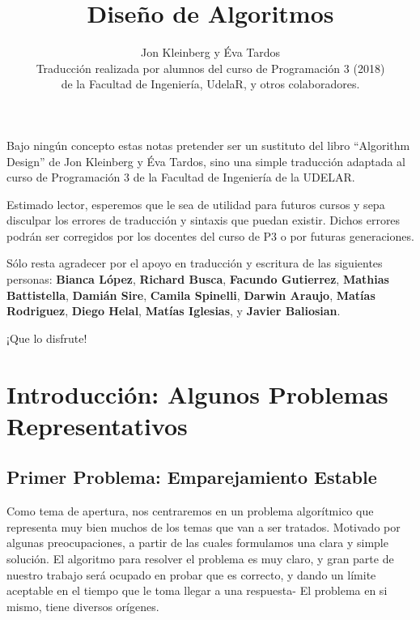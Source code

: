 \documentclass[a4paper, 12pt]{book}
\title{Diseño de Algoritmos}
\author{Jon Kleinberg y Éva Tardos\\ Traducción realizada por alumnos del curso de Programación 3 (2018)\\ de la Facultad de Ingeniería, UdelaR, y otros colaboradores.}
\theoremstyle{dotless}
\begin{document}
\maketitle	


\chapter*{}

Bajo ningún concepto estas notas pretender ser un sustituto del libro ``Algorithm Design'' de Jon Kleinberg y Éva Tardos, sino una simple traducción adaptada al curso de Programación 3 de la Facultad de Ingeniería de la UDELAR. 

Estimado lector, esperemos que le sea de utilidad para futuros cursos y sepa disculpar los errores de traducción y sintaxis que puedan existir. Dichos errores podrán ser corregidos por los docentes del curso de P3 o por futuras generaciones.

Sólo resta agradecer por el apoyo en traducción y escritura de las siguientes personas: \textbf{Bianca López}, \textbf{Richard Busca}, \textbf{Facundo Gutierrez}, \textbf{Mathias Battistella}, \textbf{Damián Sire}, \textbf{Camila Spinelli}, \textbf{Darwin Araujo},  \textbf{Matías Rodriguez}, \textbf{Diego Helal}, \textbf{Matías Iglesias}, y \textbf{Javier Baliosian}.


\begin{center}
\huge{¡Que lo disfrute!}
\end{center}


\tableofcontents



\chapter{Introducción: Algunos Problemas Representativos}
\label{cap:intro}

\section{Primer Problema: Emparejamiento Estable}
\label{sec:emparejamientoestable}

Como tema de apertura, nos centraremos en un problema algorítmico que representa muy bien muchos de los temas que van a ser tratados. Motivado por algunas preocupaciones, a partir de las cuales formulamos una clara y simple solución. El algoritmo para resolver el problema es muy claro,  y gran parte de nuestro trabajo será ocupado en probar que es correcto, y dando un límite aceptable en el tiempo que le toma llegar a una respuesta- El problema en si mismo, tiene diversos orígenes.
\end{document}
